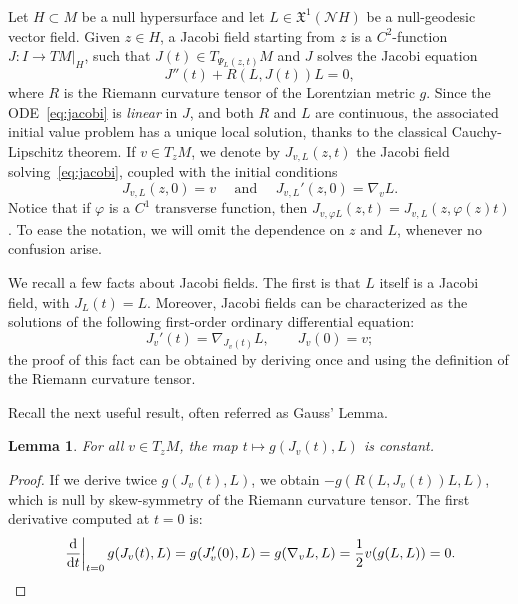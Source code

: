 \documentclass[12pt,a4paper]{amsart}
\theoremstyle{plain}
\newtheorem{lemma}{Lemma}[section]
\theoremstyle{definition}
\numberwithin{equation}{section}
\newcommand{\de}{{\mathrm{d}}}
\newcommand{\gflow}{\Psi}
\newcommand{\vfield}{\mathfrak{X}}
\newcommand{\normal}{\mathscr{N}}
\begin{document}
Let $H\subset M$ be a null hypersurface and let $L\in\vfield^{1}(\normal
H)$ be a null-geodesic vector field.
%
Given $z\in H$, a Jacobi field starting from $z$ is a $C^2$-function
$J:I\to TM|_H$, such that $J(t)\in T_{\gflow_L(z,t)} M$ and $J$ solves the
Jacobi equation
\begin{equation}
  \label{eq:jacobi}
  J''(t)
  +
  R(L,J(t))L=0,
\end{equation}
where $R$ is the Riemann curvature tensor of the Lorentzian metric
$g$. Since the ODE~\eqref{eq:jacobi} is \emph{linear} in $J$, and both $R$ and $L$ are continuous, the associated initial value problem has a unique local solution, thanks to the classical Cauchy-Lipschitz theorem.  
%
If $v\in T_zM$, we denote by $J_{v,L}(z,t)$ the Jacobi field
solving~\eqref{eq:jacobi}, coupled with the initial conditions
\begin{equation}
  \label{eq:initial-jacobi}
  J_{v,L}(z,0)=v
  \quad
  \text{ and }
  \quad
  J_{v,L}'(z,0)=\nabla_v L
  .
\end{equation}
%
Notice that if $\varphi$ is a $C^1$ transverse function, then
$J_{v,\varphi L}(z,t)=J_{v,L}(z,\varphi(z)t)$.
%
To ease the notation, we will omit the dependence on $z$ and $L$,
whenever no confusion arise.

%
We recall a few facts about Jacobi fields.
%
The first is that $L$ itself is a Jacobi field, with
$J_L(t)=L$.
%
Moreover,  Jacobi fields can be characterized as the solutions of the
following first-order ordinary differential equation:
\begin{equation}
  \label{eq:first-order-jacobi}
  J_v'(t)
  =
  \nabla_{J_v(t)} L
  ,
  \qquad
  J_v(0)=v
  ;
\end{equation}
the proof of this fact can be obtained by deriving once and using
the definition of the Riemann curvature tensor.

Recall the next useful result, often referred as Gauss' Lemma.
\begin{lemma}
  \label{lem:gauss}
  For all $v\in T_zM$, the map $t\mapsto g(J_v(t),L)$ is constant.
\end{lemma}
\begin{proof}
  If we derive twice $g(J_v(t),L)$, we obtain $-g(R(L,J_v(t))L,L)$,
  which is null by skew-symmetry of the Riemann curvature tensor.
  The first derivative computed at $t=0$ is:
  \begin{equation*}
    \left.
      \frac{\de}{\de t}
    \right|_{t=0}
    g(J_v(t),L)
    =
    g(J_v'(0),L)
    =
    g(\nabla_v L,L)
    =
    \frac{1}{2}
    v(g(L,L))
    =0.
    \qedhere
  \end{equation*}
\end{proof}
\end{document}
